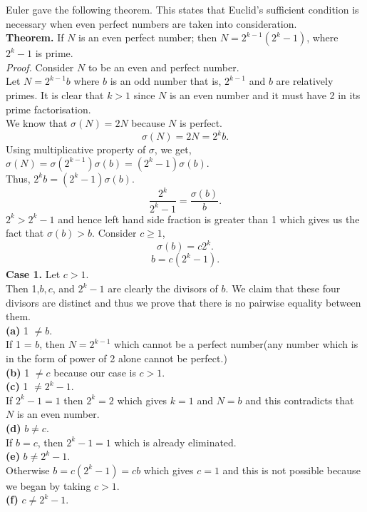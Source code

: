 \documentclass[a4paper,11pt]{article}
\begin{document}
Euler gave the following theorem. This states that Euclid's sufficient condition is necessary when even perfect numbers are taken into consideration.\\
\textbf{Theorem.} If $N$ is an even perfect number; then $N = 2^{k- 1} (2^k-1)$, where $2^k - 1 $ is prime. \\
\textit{Proof.} Consider $N$ to be an even and perfect number.\\
Let $N = 2^{k-1}b$ where $b$ is an odd number that is, $2^{k-1}$ and $b$ are relatively primes. It is clear that $k > 1$ since $N$ is an even number and it must have 2 in its prime factorisation.\\
We know that $\sigma(N) = 2N$ because $N$ is perfect.\\
$$\sigma(N) = 2N = 2^kb.$$
Using multiplicative property of $\sigma$, we get,\\
$\sigma(N) = \sigma(2^{k-1})\sigma(b) = (2^k-1)\sigma(b).$\\
Thus, $2^kb = (2^k-1)\sigma(b). $\\
$$\frac{2^k}{2^k-1} = \frac{\sigma(b)}{b}.$$
$2^k > 2^k-1$ and hence left hand side fraction is greater than 1 which gives us the fact that $\sigma(b) > b.$ Consider $c \geq 1$,\\
$$\sigma(b) = c2^k.$$
$$b = c(2^k-1).$$
\textbf{Case 1.} Let $c > 1$.\\
Then 1,$ b, c$, and $2^k - 1$ are clearly the divisors of $b$. We claim that these four divisors are distinct and thus we prove that there is no pairwise equality between them. \\
\textbf{(a)} 1 $\neq b$.\\
If 1 = $b$, then $N=2^{k-1}$ which cannot be a perfect number(any number which is in the form of power of 2 alone cannot be perfect.)\\
\textbf{(b)} 1 $\neq c$ because our case is $c > 1$.\\
\textbf{(c)} 1 $\neq 2^k-1.$\\
If $2^k-1 = 1 $ then $2^k =2$ which gives $k=1$ and $N=b$ and this contradicts that $N$ is an even number.\\
\textbf{(d)} $b \neq c$.\\
If $b=c$, then $2^k-1 = 1$ which is already eliminated.\\
\textbf{(e)} $b \neq 2^k-1$.\\
Otherwise $b = c(2^k-1) = cb$ which gives $c=1$ and this is not possible because we began by taking $c > 1.$\\
\textbf{(f)}  $c \neq 2^k-1.$\\
\end{document}
